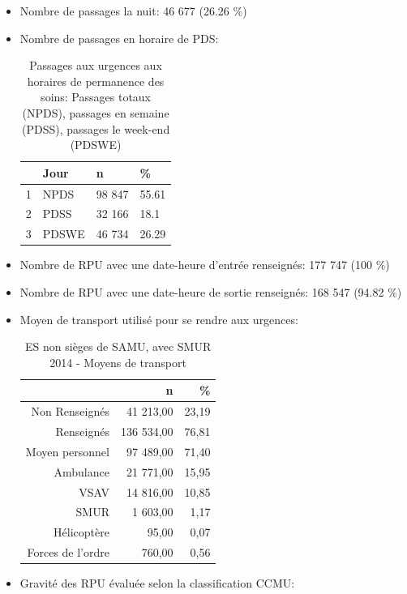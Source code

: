 \documentclass[]{article}
\begin{document}
\begin{itemize}
\item
  Nombre de passages la nuit: 46 677 (26.26 \%)
\item
  Nombre de passages en horaire de PDS:

  \begin{table}[ht]
  \centering
  \begin{tabular}{rlll}
    \hline
   & Jour & n & \% \\ 
    \hline
  1 & NPDS & 98 847 & 55.61 \\ 
    2 & PDSS & 32 166 & 18.1 \\ 
    3 & PDSWE & 46 734 & 26.29 \\ 
     \hline
  \end{tabular}
  \caption{Passages aux urgences aux horaires de permanence des soins: Passages totaux (NPDS), passages  en semaine (PDSS), passages le week-end (PDSWE)} 
  \end{table}
\item
  Nombre de RPU avec une date-heure d'entrée renseignés: 177 747 (100
  \%)
\item
  Nombre de RPU avec une date-heure de sortie renseignés: 168 547 (94.82
  \%)
\item
  Moyen de transport utilisé pour se rendre aux urgences:

  \begin{table}[ht]
  \centering
  \begin{tabular}{rrr}
    \hline
   & n & \% \\ 
    \hline
  Non Renseignés & 41 213,00 & 23,19 \\ 
    Renseignés & 136 534,00 & 76,81 \\ 
    Moyen personnel & 97 489,00 & 71,40 \\ 
    Ambulance & 21 771,00 & 15,95 \\ 
    VSAV & 14 816,00 & 10,85 \\ 
    SMUR & 1 603,00 & 1,17 \\ 
    Hélicoptère & 95,00 & 0,07 \\ 
    Forces de l'ordre & 760,00 & 0,56 \\ 
     \hline
  \end{tabular}
  \caption{ES non sièges de SAMU, avec SMUR 2014 - Moyens de transport} 
  \end{table}
\item
  Gravité des RPU évaluée selon la classification CCMU:


\end{itemize}
\end{document}
